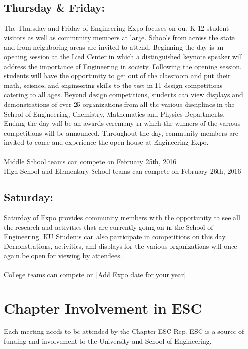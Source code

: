 \subsection*{Thursday \& Friday:}

The Thursday and Friday of Engineering Expo focuses on our K-12 student visitors as well as community members at large. Schools from across the state and from neighboring areas are invited to attend. Beginning the day is an opening session at the Lied Center in which a distinguished keynote speaker will address the importance of Engineering in society. Following the opening session, students will have the opportunity to get out of the classroom and put their math, science, and engineering skills to the test in 11 design competitions catering to all ages. Beyond design competitions, students can view displays and demonstrations of over 25 organizations from all the various disciplines in the School of Engineering, Chemistry, Mathematics and Physics Departments.  Ending the day will be an awards ceremony in which the winners of the various competitions will be announced. Throughout the day, community members are invited to come and experience the open-house at Engineering Expo.
\\
\\
Middle School teams can compete on February 25th, 2016
\\
High School and Elementary School teams can compete on February 26th, 2016

\subsection*{Saturday:}

Saturday of Expo provides community members with the opportunity to see all the research and activities that are currently going on in the School of Engineering. KU Students can also participate in competitions on this day. Demonstrations, activities, and displays for the various organizations will once again be open for viewing by attendees.
\\
\\
College teams can compete on [Add Expo date for your year]

\section{Chapter Involvement in ESC}

Each meeting needs to be attended by the Chapter ESC Rep. ESC is a source of funding and involvement to the University and School of Engineering.

